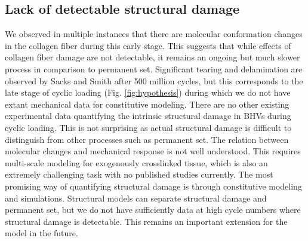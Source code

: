 \subsection{Lack of detectable structural damage}
	We observed in multiple instances \cite{sun_response_2004, sellaro_effects_2007} that there are molecular conformation changes in the collagen fiber during this early stage. 
	This suggests that while effects of collagen fiber damage are not detectable, it remains an ongoing but much slower process in comparison to permanent set. 
	Significant tearing and delamination are observed by Sacks and Smith \cite{sacks_effects_1998} after 500 million cycles, but this corresponds to the late stage of cyclic loading (Fig. \ref{fig:hypothesis}) during which we do not have extant mechanical data for constitutive modeling. 
	There are no other existing experimental data quantifying the intrinsic structural damage in BHVs during cyclic loading. 
	This is not surprising as actual structural damage is difficult to distinguish from other processes such as permanent set. 
	The relation between molecular changes and mechanical response is not well understood. 
	This requires multi-scale modeling for exogenously crosslinked tissue, which is also an extremely challenging task with no published studies currently. 
	The most promising way of quantifying structural damage is through constitutive modeling and simulations. 
	Structural models can separate structural damage and permanent set, but we do not have sufficiently data at high cycle numbers where structural damage is detectable. 
	This remains an important extension for the model in the future. 

